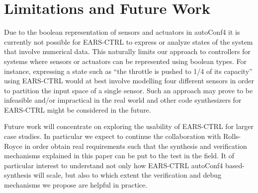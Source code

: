 \section{Limitations and Future Work}
\label{sec:limfuturework}

Due to the boolean representation of sensors and actuators in \textsf{autoConf4}
 it is currently not possible for \textsf{EARS-CTRL} to express or analyze
states of the system that involve numerical data. This naturally limits our
approach to controllers for systems where sensors or actuators can be
represented using boolean types.
For instance, expressing a state such as ``the throttle is pushed to 1/4 of its
capacity'' using \textsf{EARS-CTRL} would at best involve modelling four
different sensors in order to partition the input space of a single sensor. Such
an approach may prove to be infeasible and/or impractical in the real world and
other code synthesizers for \textsf{EARS-CTRL}  might be considered in the
future.

Future work will concentrate on exploring the usability of
\textsf{EARS-CTRL} for larger case studies. In particular we expect to continue
the collaboration with Rolls-Royce in order obtain real requirements such that
the synthesis and verification mechanisms explained in this paper can be put to
the test in the field. It of particular interest to understand not only how
\textsf{EARS-CTRL} \textsf{autoConf4} based-synthesis will scale, but also to
which extent the verification and debug mechanisms we propose are helpful in
practice.
